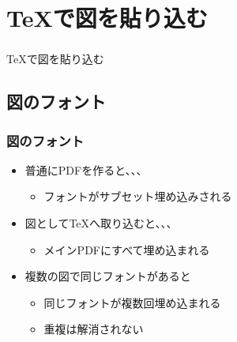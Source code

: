 \documentclass[unicode,17pt]{beamer}
\begin{document}
\section{\TeX で図を貼り込む}
\begin{frame}\frametitle{}
  \centering
  \TeX で図を貼り込む
\end{frame}

\subsection{図のフォント}
\begin{frame}\frametitle{図のフォント}
  \begin{itemize}
  \item 普通にPDFを作ると、、、
    \begin{itemize}
    \item フォントがサブセット埋め込みされる
    \end{itemize}
  \end{itemize}
  \centering
  \begin{itemize}
  \item 図として\TeX へ取り込むと、、、
    \begin{itemize}
    \item メインPDFにすべて埋め込まれる
    \end{itemize}
  \item 複数の図で同じフォントがあると
    \begin{itemize}
    \item 同じフォントが複数回埋め込まれる  
    \item 重複は解消されない
    \end{itemize}
  \end{itemize}
\end{frame}
\end{document}
